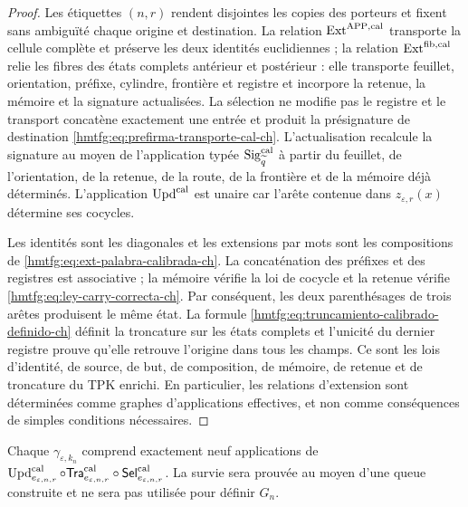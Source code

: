 \begin{proof}
Les étiquettes \((n,r)\) rendent disjointes les copies des porteurs et fixent
sans ambiguïté chaque origine et destination. La relation
\(\operatorname{Ext}^{\mathrm{APP},\rm cal}\) transporte la cellule complète et
préserve les deux identités euclidiennes ; la relation
\(\operatorname{Ext}^{\rm fib,cal}\) relie les fibres des états
complets antérieur et postérieur : elle transporte feuillet, orientation, préfixe,
cylindre, frontière et registre et incorpore la retenue, la mémoire et la signature
actualisées. La sélection ne modifie pas le registre et le transport concatène
exactement une entrée et produit la présignature de destination
\eqref{hmtfg:eq:prefirma-transporte-cal-ch}. L’actualisation recalcule la signature au moyen de
l’application typée \(\operatorname{Sig}^{\rm cal}_{\widetilde q}\) à partir du
feuillet, de l’orientation, de la retenue, de la route, de la frontière et de la mémoire déjà déterminés. L’application
\(\operatorname{Upd}^{\rm cal}\) est unaire car l’arête contenue dans
\(z_{\varepsilon,r}(x)\) détermine ses cocycles.

Les identités sont les diagonales et les extensions par mots sont les
compositions de \eqref{hmtfg:eq:ext-palabra-calibrada-ch}. La concaténation des
préfixes et des registres est associative ; la mémoire vérifie la loi de cocycle et
la retenue vérifie
\eqref{hmtfg:eq:ley-carry-correcta-ch}. Par conséquent, les deux parenthésages de trois
arêtes produisent le même état. La formule
\eqref{hmtfg:eq:truncamiento-calibrado-definido-ch} définit la troncature sur
les états complets et l’unicité du dernier registre prouve qu’elle retrouve
l’origine dans tous les champs. Ce sont les lois d’identité, de source,
de but, de composition, de mémoire, de retenue et de troncature du TPK enrichi.
En particulier, les relations d’extension sont déterminées comme graphes
d’applications effectives, et non comme conséquences de simples conditions
nécessaires.
\end{proof}

Chaque \(\gamma_{\varepsilon,k_n}\) comprend exactement neuf applications de \(\operatorname{Upd}^{\rm cal}_{e_{\varepsilon,n,r}}\circ
\mathsf{Tra}^{\rm cal}_{e_{\varepsilon,n,r}}\circ
\mathsf{Sel}^{\rm cal}_{e_{\varepsilon,n,r}}\). La survie sera prouvée au moyen d'une queue construite et ne sera pas utilisée pour définir \(G_n\).

